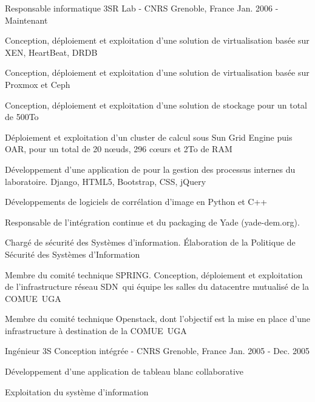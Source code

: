 

\begin{cventries}

  \cventry
    {Responsable informatique} %
    {3SR Lab - CNRS} %
    {Grenoble, France} %
    {Jan. 2006 - Maintenant} %
    {
      \begin{cvitems} %
        \item {Conception, déploiement et exploitation d'une solution de virtualisation basée sur XEN, HeartBeat, DRDB}
        \item {Conception, déploiement et exploitation d'une solution de virtualisation basée sur Proxmox et Ceph}
        \item {Conception, déploiement et exploitation d'une solution de stockage pour un total de 500To}
        \item {Déploiement et exploitation d'un cluster de calcul sous Sun Grid Engine puis OAR, pour un total de 20 nœuds, 296 cœurs et 2To de RAM}
        \item {Développement d'une application de pour la gestion des processus internes du laboratoire. Django, HTML5, Bootstrap, CSS, jQuery}
        \item {Développements de logiciels de corrélation d'image en Python et C++}
        \item {Responsable de l'intégration continue et du packaging de Yade (yade-dem.org).}
        \item {Chargé de sécurité des Systèmes d'information. Élaboration de la Politique de Sécurité des Systèmes d'Information}
        \item {Membre du comité technique SPRING. Conception, déploiement et exploitation de l'infrastructure réseau SDN qui équipe les salles du datacentre mutualisé de la COMUE UGA}
        \item {Membre du comité technique Openstack, dont l'objectif est la mise en place d'une infrastructure à destination de la COMUE UGA}
      \end{cvitems}
    }

  \cventry
    {Ingénieur} %
    {3S Conception intégrée - CNRS} %
    {Grenoble, France} %
    {Jan. 2005 - Dec. 2005} %
    {
      \begin{cvitems} %
        \item {Développement d'une application de tableau blanc collaborative}
        \item {Exploitation du système d'information}
      \end{cvitems}
    }

\end{cventries}
